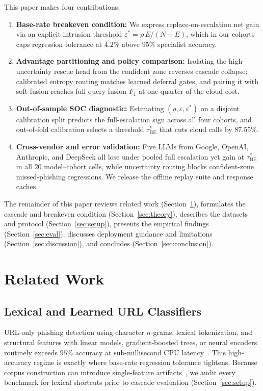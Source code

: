 \documentclass[conference,a4paper]{IEEEtran}
\newcommand{\eps}{\varepsilon}
\newcommand{\epsstar}{\eps^{\ast}}
\newcommand{\rrescue}{\rho}
\begin{document}
This paper makes four contributions:
\begin{enumerate}
\item \textbf{Base-rate breakeven condition:} We express replace-on-escalation net
gain via an explicit intrusion threshold $\epsstar = \rrescue\,E/(N-E)$, which in our
cohorts caps regression tolerance at $4.2\%$ above $95\%$ specialist accuracy.
\item \textbf{Advantage partitioning and policy comparison:} Isolating the
high-uncertainty rescue head from the confident zone reverses cascade collapse;
calibrated entropy routing matches learned deferral gates, and pairing it with soft
fusion reaches full-query fusion $F_1$ at one-quarter of the cloud cost.
\item \textbf{Out-of-sample SOC diagnostic:} Estimating $(\rrescue,\eps,\epsstar)$
on a disjoint calibration split predicts the full-escalation sign across all four
cohorts, and out-of-fold calibration selects a threshold $\tau^{\ast}_{\mathrm{BE}}$
that cuts cloud calls by $87.55\%$.
\item \textbf{Cross-vendor and error validation:} Five LLMs from Google, OpenAI,
Anthropic, and DeepSeek all lose under pooled full escalation yet gain at
$\tau^{\ast}_{\mathrm{BE}}$ in all $20$ model--cohort cells, while uncertainty
routing blocks confident-zone missed-phishing regressions. We release the offline
replay suite and response caches.
\end{enumerate}

The remainder of this paper reviews related work (Section~\ref{sec:related}),
formulates the cascade and breakeven condition (Section~\ref{sec:theory}), describes
the datasets and protocol (Section~\ref{sec:setup}), presents the empirical findings
(Section~\ref{sec:eval}), discusses deployment guidance and limitations
(Section~\ref{sec:discussion}), and concludes (Section~\ref{sec:conclusion}).

\section{Related Work}
\label{sec:related}
\subsection{Lexical and Learned URL Classifiers}
URL-only phishing detection using character $n$-grams, lexical tokenization, and
structural features with linear models, gradient-boosted trees, or neural encoders
routinely exceeds $95\%$ accuracy at sub-millisecond CPU latency~\cite{sahingoz2019,prasad2024,sahoo2019}.
This high-accuracy regime is exactly where base-rate regression tolerance tightens.
Because corpus construction can introduce single-feature artifacts~\cite{abdillah2023eval},
we audit every benchmark for lexical shortcuts prior to cascade evaluation
(Section~\ref{sec:setup}).
\end{document}
